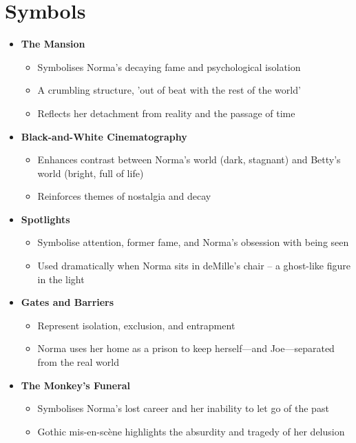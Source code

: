 \documentclass[a4paper]{article}
\begin{document}
\newpage
\section{Symbols}
\begin{itemize}
    \item \textbf{The Mansion}  
    \begin{itemize}
        \item Symbolises Norma's decaying fame and psychological isolation  
        \item A crumbling structure, 'out of beat with the rest of the world'  
        \item Reflects her detachment from reality and the passage of time  
    \end{itemize}

    \item \textbf{Black-and-White Cinematography}  
    \begin{itemize}
        \item Enhances contrast between Norma's world (dark, stagnant) and Betty's world (bright, full of life)  
        \item Reinforces themes of nostalgia and decay  
    \end{itemize}

    \item \textbf{Spotlights}  
    \begin{itemize}
        \item Symbolise attention, former fame, and Norma’s obsession with being seen  
        \item Used dramatically when Norma sits in deMille’s chair – a ghost-like figure in the light  
    \end{itemize}

    \item \textbf{Gates and Barriers}  
    \begin{itemize}
        \item Represent isolation, exclusion, and entrapment  
        \item Norma uses her home as a prison to keep herself—and Joe—separated from the real world  
    \end{itemize}

    \item \textbf{The Monkey’s Funeral}  
    \begin{itemize}
        \item Symbolises Norma’s lost career and her inability to let go of the past  
        \item Gothic mis-en-scène highlights the absurdity and tragedy of her delusion  
    \end{itemize}


\end{itemize}
\end{document}
